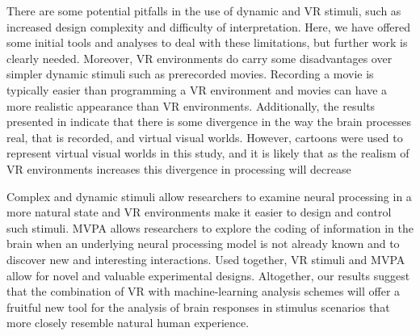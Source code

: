 \documentclass[preprint,5p,authoryear]{elsarticle}
\begin{document}
There are some potential pitfalls in the use of dynamic and VR stimuli, such as increased design complexity and difficulty of interpretation. 
Here, we have offered some initial tools and analyses to deal with these limitations, but further work is clearly needed.
Moreover, VR environments do carry some disadvantages over simpler dynamic stimuli such as prerecorded movies. 
Recording a movie is typically easier than programming a VR environment and movies can have a more realistic appearance than VR environments.
Additionally, the results presented in \cite{Han2005} indicate that there is some divergence in the way the brain processes real, that is recorded, and virtual visual worlds. 
However, cartoons were used to represent virtual visual worlds in this study, and it is likely that as the realism of VR environments increases this divergence in processing will decrease

Complex and dynamic stimuli allow researchers to examine neural processing in a more natural state and VR environments make it easier to design and control such stimuli.
MVPA allows researchers to explore the coding of information in the brain when an underlying neural processing model is not already known and to discover new and interesting interactions.
Used together, VR stimuli and MVPA allow for novel and valuable experimental designs.
Altogether, our results suggest that the combination of VR with machine-learning analysis schemes will offer a fruitful new tool for the analysis of brain responses in stimulus scenarios that more closely resemble natural human experience.


\end{document}
